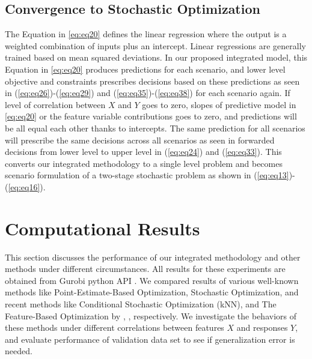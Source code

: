 \documentclass[12pt]{article}
\begin{document}
\subsection{Convergence to Stochastic Optimization}
The Equation in \ref{eq:eq20} defines the linear regression where the output is a weighted combination of inputs plus an intercept. Linear regressions are generally trained based on mean squared deviations. In our proposed integrated model, this Equation in \ref{eq:eq20} produces predictions for each scenario, and lower level objective and constraints prescribes decisions based on these predictions as seen in (\ref{eq:eq26})-(\ref{eq:eq29}) and (\ref{eq:eq35})-(\ref{eq:eq38}) for each scenario again. If level of correlation between $X$ and $Y$ goes to zero, slopes of predictive model in  \ref{eq:eq20} or the feature variable contributions goes to zero, and predictions will be all equal each other thanks to intercepts. The same prediction for all scenarios will prescribe the same decisions across all scenarios as seen in forwarded decisions from lower level to upper level in (\ref{eq:eq24}) and (\ref{eq:eq33}). This converts our integrated methodology to a single level problem and becomes scenario formulation of a two-stage stochastic problem as shown in (\ref{eq:eq13})-(\ref{eq:eq16}).

\section{Computational Results}
This section discusses the performance of our integrated methodology and other methods under different circumstances. All results for these experiments are obtained from Gurobi python API \cite{gurobi}. We compared results of various well-known methods like Point-Estimate-Based Optimization, Stochastic Optimization, and recent methods like Conditional Stochastic Optimization (kNN), and The Feature-Based Optimization by \cite{doi:10.1287/mnsc.2018.3253}, \cite{Ban2019TheBD}, respectively. We investigate the behaviors of these methods under different correlations between features $X$ and responses $Y$, and evaluate performance of validation data set to see if generalization error is needed.
\end{document}
